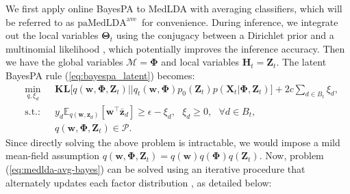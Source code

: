 \documentclass[twoside,11pt]{article}
\newcommand{\Xv}{\bm{X}}
\newcommand{\zv}{\bm{z}}
\newcommand{\Zv}{\bm{Z}}
\newcommand{\Hv}{\bm{H}}
\newcommand{\wv}{\bm{w}}
\newcommand{\Thetav}{\bm{\Theta}}
\newcommand{\Phiv}{\bm{\Phi}}
\newcommand{\Mv}{\bm{\mathcal{M}}}
\newcommand{\ep}{\mathbb{E}}
\newcommand{\KL}{\textbf{KL}}
\newcommand{\barzv}{\bm{\bar{z}}}
\newcommand{\subto}{\text{s.t.:}}
\newcommand\paMedLDAave{$\text{paMedLDA}^{\text{ave}}$~}
\begin{document}
We first apply online BayesPA to MedLDA with averaging classifiers, which will be referred to as \paMedLDAave for convenience. During inference, we integrate out the local variables $\Thetav_t$ using the conjugacy between a Dirichlet prior and a multinomial likelihood \citep{griffiths2004finding,teh2006collapsed}, which potentially improves the inference accuracy. Then we have the global variables $\Mv = \Phiv$ and local variables $\Hv_t = \Zv_t$. The latent BayesPA rule (\ref{eq:bayespa_latent}) becomes:
\begin{eqnarray}\label{eq:medlda-avg-bayes}
 &  \underset{q, \xi_d}{\operatorname{min}}~~~ & \KL\Big[q(\wv, \Phiv, \Zv_t) || q_t(\wv, \Phiv) p_0(\Zv_t) p(\Xv_t | \Phiv, \Zv_t) \Big] + 2c \sum\limits_{d \in B_t}{\xi_d}, \\
 & \subto &  y_d \ep_{q(\wv, \zv_d)}[\wv^\top \barzv_d] \geq \epsilon-\xi_d, ~~~ \xi_d \geq 0, ~~~  \forall d \in B_t,  \nonumber \\
 &            & q(\wv, \Phiv, \Zv_t) \in \mathcal{P}. \nonumber
\end{eqnarray}
%
Since directly solving the above problem is intractable, we would impose a mild mean-field assumption $q(\wv, \Phiv, \Zv_t) = q(\wv) q(\Phiv) q(\Zv_t)$. Now, problem (\ref{eq:medlda-avg-bayes}) can be solved using an iterative procedure that alternately updates each factor distribution \citep{jordan1998introduction}, as detailed below:
%
\end{document}
